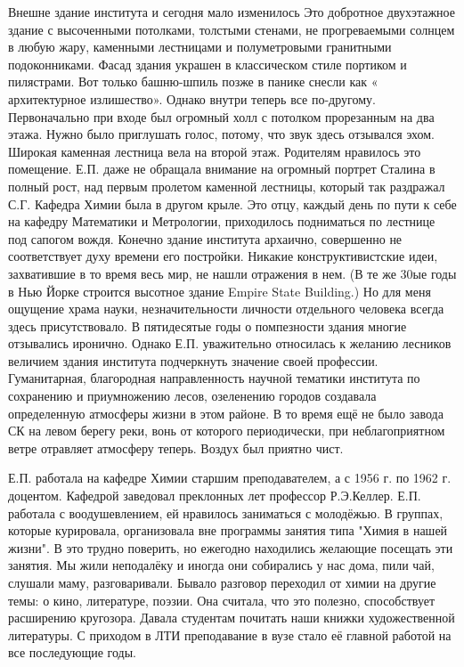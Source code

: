 Внешне здание института и сегодня мало изменилось Это добротное двухэтажное здание с высоченными потолками, толстыми стенами, не прогреваемыми солнцем в любую жару, каменными лестницами и полуметровыми гранитными подоконниками. Фасад здания украшен в классическом стиле портиком и пилястрами. Вот только башню-шпиль позже в панике снесли как « архитектурное излишество». Однако внутри теперь все по-другому. Первоначально при входе был огромный холл с потолком прорезанным на два этажа. Нужно было приглушать голос, потому, что звук здесь отзывался эхом. Широкая каменная лестница вела на второй этаж. Родителям нравилось это помещение. Е.П. даже не обращала внимание на огромный портрет Сталина в полный рост, над первым пролетом каменной лестницы, который так раздражал С.Г. Кафедра Химии была в другом крыле. Это отцу, каждый день по пути к себе на кафедру Математики и Метрологии, приходилось подниматься по лестнице под сапогом вождя. Конечно здание института архаично, совершенно не соответствует духу времени его постройки. Никакие конструктивистские идеи, захватившие в то время весь мир, не нашли отражения в нем. (В те же 30ые годы в Нью Йорке строится высотное здание Empire State Building.) Но для меня ощущение храма науки, незначительности личности отдельного человека всегда здесь присутствовало. В пятидесятые годы о помпезности здания многие отзывались иронично. Однако Е.П. уважительно относилась к желанию лесников величием здания института подчеркнуть значение своей профессии. Гуманитарная, благородная направленность научной тематики института по сохранению и приумножению лесов, озеленению городов создавала определенную атмосферы жизни в этом районе. В то время ещё не было завода СК на левом берегу реки, вонь от которого периодически, при неблагоприятном ветре отравляет атмосферу теперь. Воздух был приятно чист.

Е.П. работала на кафедре Химии старшим преподавателем, а с 1956 г. по 1962 г. доцентом. Кафедрой заведовал преклонных лет профессор Р.Э.Келлер. Е.П. работала с воодушевлением, ей нравилось заниматься с молодёжью. В группах, которые курировала, организовала вне программы занятия типа "Химия в нашей жизни". В это трудно поверить, но ежегодно находились желающие посещать эти занятия. Мы жили неподалёку и иногда они собирались у нас дома, пили чай, слушали маму, разговаривали. Бывало разговор переходил от химии на другие темы: о кино, литературе, поэзии. Она считала, что это полезно, способствует расширению кругозора. Давала студентам почитать наши книжки художественной литературы. С приходом в ЛТИ преподавание в вузе стало её главной работой на все последующие годы.

